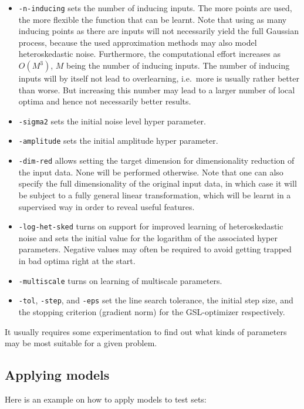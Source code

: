\documentclass[10pt]{report}
\begin{document}
\begin{itemize}
\item \verb=-n-inducing= sets the number of inducing inputs.  The more points
are used, the more flexible the function that can be learnt.  Note that using as
many inducing points as there are inputs will not necessarily yield the full
Gaussian process, because the used approximation methods may also model
heteroskedastic noise.  Furthermore, the computational effort increases as
$O(M^3)$, $M$ being the number of inducing inputs.  The number of inducing
inputs will by itself not lead to overlearning, i.e.\ more is usually rather
better than worse. But increasing this number may lead to a larger number of
local optima and hence not necessarily better results.
\item \verb=-sigma2= sets the initial noise level hyper parameter.
\item \verb=-amplitude= sets the initial amplitude hyper parameter.
\item \verb=-dim-red= allows setting the target dimension for dimensionality
reduction of the input data.  None will be performed otherwise.  Note that one
can also specify the full dimensionality of the original input data, in which
case it will be subject to a fully general linear transformation, which will be
learnt in a supervised way in order to reveal useful features.
\item \verb=-log-het-sked= turns on support for improved learning of
heteroskedastic noise and sets the initial value for the logarithm of the
associated hyper parameters.  Negative values may often be required to avoid
getting trapped in bad optima right at the start.
\item \verb=-multiscale= turns on learning of multiscale parameters.
\item \verb=-tol=, \verb=-step=, and \verb=-eps= set the line search tolerance,
the initial step size, and the stopping criterion (gradient norm) for the
GSL-optimizer respectively.
\end{itemize}

It usually requires some experimentation to find out what kinds of parameters
may be most suitable for a given problem.

\subsection{Applying models}

Here is an example on how to apply models to test sets:
\end{document}
